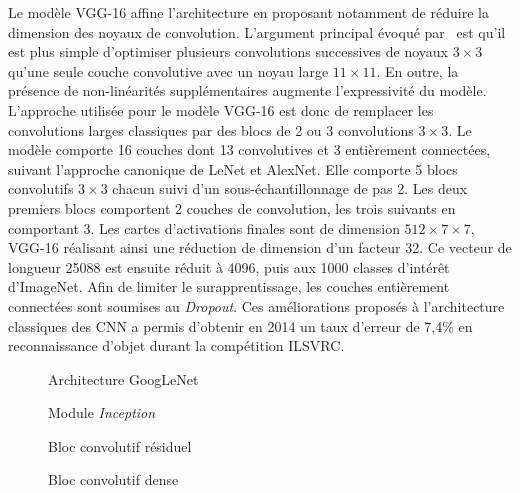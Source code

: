 Le modèle VGG-16 affine l'architecture en proposant notamment de réduire la dimension des noyaux de convolution. L'argument principal évoqué par~\cite{chatfield_return_2014,simonyan_very_2014} est qu'il est plus simple d'optimiser plusieurs convolutions successives de noyaux $3\times3$ qu'une seule couche convolutive avec un noyau large $11\times11$. En outre, la présence de non-linéarités supplémentaires augmente l'expressivité du modèle. L'approche utilisée pour le modèle VGG-16 est donc de remplacer les convolutions larges classiques par des blocs de 2 ou 3 convolutions $3\times3$. Le modèle comporte 16 couches dont 13 convolutives et 3 entièrement connectées, suivant l'approche canonique de LeNet et AlexNet. Elle comporte 5 blocs convolutifs $3\times3$ chacun suivi d'un sous-échantillonnage de pas 2. Les deux premiers blocs comportent 2 couches de convolution, les trois suivants en comportant 3. Les cartes d'activations finales sont de dimension $512\times7\times7$, VGG-16 réalisant ainsi une réduction de dimension d'un facteur 32. Ce vecteur de longueur 25088 est ensuite réduit à 4096, puis aux 1000 classes d'intérêt d'ImageNet. Afin de limiter le surapprentissage, les couches entièrement connectées sont soumises au \emph{Dropout}. Ces améliorations proposés à l'architecture classiques des \gls{CNN} a permis d'obtenir en 2014 un taux d'erreur de 7,4\% en reconnaissance d'objet durant la compétition \gls{ILSVRC}.


\begin{figure}[t]
  \resizebox{\textwidth}{!}{
    
  }
  \caption{Architecture GoogLeNet~\cite{szegedy_going_2015}}
  \label{fig:googlenet}
\end{figure}

\begin{figure}
  \resizebox{\textwidth}{!}{
    
  }
  \caption{Module \emph{Inception}~\cite{szegedy_going_2015}}
  \label{fig:inception}
\end{figure}

\begin{figure}[t]
  \begin{minipage}{0.5\textwidth}
    \resizebox{\textwidth}{!}{
      
    }
    \caption{Bloc convolutif résiduel~\cite{he_deep_2016}}
    \label{fig:residual}
  \end{minipage}
  \begin{minipage}{0.5\textwidth}
  \resizebox{\textwidth}{!}{
    
  }
  \caption{Bloc convolutif dense~\cite{huang_densely_2017}}
  \label{fig:denseblock}
  \end{minipage}
\end{figure}

